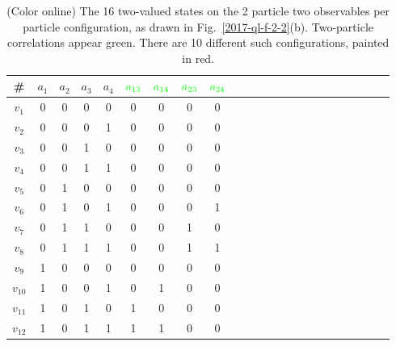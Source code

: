 \documentclass[%
  twocolumn,
 showpacs,
 showkeys,
 preprintnumbers,
 amsmath,amssymb,
 aps,
  pra,
  longbibliography,
 floatfix,
 ]{revtex4-1}
\begin{document}
 \begin{table}%
 \begin{center}
 \caption{\label{2017-CHSH-tvs} (Color online) The 16 two-valued states on the 2 particle two observables per particle configuration,
as drawn in Fig.~\ref{2017-ql-f-2-2}(b).
Two-particle correlations appear {\color{green} green}. There are 10 different such configurations, painted in {\color{red}  red}.}
 \begin{ruledtabular}
 \begin{tabular}{ccccccccccccccccccccccc}
\# &$a_1$&$a_2$&$a_3$&$a_4$&${\color{green}  a_{13}}$&${\color{green}  a_{14}}$&${\color{green}  a_{23}}$&${\color{green}  a_{24}}$\\
\hline
$v_1   $&0  &  0 &   0 &   0  & {\color{red}  0}&   {\color{red}  0} &  {\color{red}  0}  &  {\color{red}  0}\\
$v_2   $&0  &  0 &   0 &   1  & {\color{green}  0}&   {\color{green}  0} &  {\color{green}   0}  &  {\color{green}  0}\\
$v_3   $&0  &  0 &   1 &   0  & {\color{green}  0}&   {\color{green}  0} &  {\color{green}   0}  &  {\color{green}  0}\\
$v_4   $&0  &  0 &   1 &   1  & {\color{green}  0}&   {\color{green}  0} &  {\color{green}   0}  &  {\color{green}  0}\\
$v_5   $&0  &  1 &   0 &   0  & {\color{green}  0}&   {\color{green}  0} &  {\color{green}   0}  &  {\color{green}  0}\\
$v_6   $&0  &  1 &   0 &   1  & {\color{red}  0}&   {\color{red}  0} &  {\color{red}  0}  &  {\color{red}  1}\\
$v_7   $&0  &  1 &   1 &   0  & {\color{red}  0}&   {\color{red}  0} &  {\color{red}  1}  &  {\color{red}  0}\\
$v_8   $&0  &  1 &   1 &   1  & {\color{red}  0}&   {\color{red}  0} &  {\color{red}  1}  &  {\color{red}  1}\\
$v_9   $&1  &  0 &   0 &   0  & {\color{green}  0}&   {\color{green}  0} &  {\color{green}   0}  &  {\color{green}  0}\\
$v_{10}$&1  &  0 &   0 &   1  & {\color{red}  0}&   {\color{red}  1} &  {\color{red}  0}  &  {\color{red}  0}\\
$v_{11}$&1  &  0 &   1 &   0  & {\color{red}  1}&   {\color{red}  0} &  {\color{red}  0}  &  {\color{red}  0}\\
$v_{12}$&1  &  0 &   1 &   1  & {\color{red}  1}&   {\color{red}  1} &  {\color{red}  0}  &  {\color{red}  0}\\

\end{tabular}
\end{ruledtabular}
\end{center}
\end{table}
\end{document}
